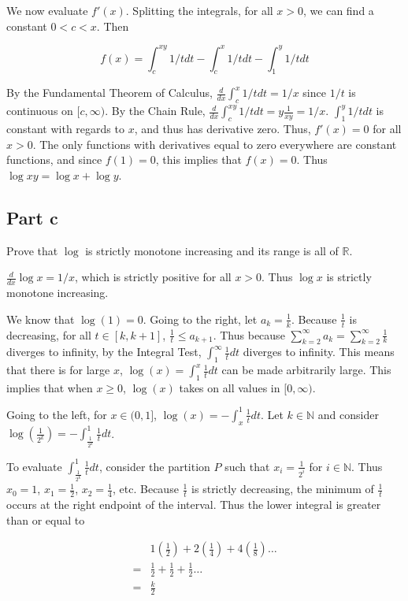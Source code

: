\documentclass{article}
\newcommand{\R}{\mathbb{R}}
\newcommand{\N}{\mathbb{N}}
\begin{document}
We now evaluate $f'(x)$. Splitting the integrals, for all $x>0$, we can find a constant $0 < c < x$. Then

\[
f(x) = \int_c^{xy} 1/t dt - \int_c^x 1/t dt - \int_1^y 1/t dt
\]

By the Fundamental Theorem of Calculus, $\frac{d}{dx} \int_c^x 1/t dt = 1/x$ since $1/t$ is continuous on $[c, \infty)$. By the Chain Rule, $\frac{d}{dx} \int_c^{xy} 1/t dt = y\frac{1}{xy} = 1/x$. $\int_1^y 1/t dt$ is constant with regards to $x$, and thus has derivative zero. Thus, $f'(x) = 0$ for all $x > 0$. The only functions with derivatives equal to zero everywhere are constant functions, and since $f(1) = 0$, this implies that $f(x) = 0$. Thus $\log xy = \log x + \log y$.

\subsection*{Part c}

Prove that $\log$ is strictly monotone increasing and its range is all of $\R$.

$\frac{d}{dx} \log x = 1/x$, which is strictly positive for all $x > 0$. Thus $\log x$ is strictly monotone increasing.

We know that $\log (1) = 0$. Going to the right, let $a_k = \frac{1}{k}$. Because $\frac{1}{t}$ is decreasing, for all $t \in [k, k+1]$, $\frac{1}{t} \leq a_{k+1}$. Thus because $\sum_{k=2}^\infty a_k = \sum_{k=2}^\infty \frac{1}{k}$ diverges to infinity, by the Integral Test, $\int_1^\infty \frac{1}{t} dt$ diverges to infinity. This means that there is for large $x$, $\log (x) = \int_1^x \frac{1}{t} dt$ can be made arbitrarily large. This implies that when $x \geq 0$, $\log(x)$ takes on all values in $[0, \infty)$.

Going to the left, for $x \in (0, 1]$, $\log(x) = - \int_x^1 \frac{1}{t} dt$. Let $k \in \N$ and consider $\log(\frac{1}{2^k}) = - \int_\frac{1}{2^k}^1 \frac{1}{t} dt$.

To evaluate $\int_\frac{1}{2^k}^1 \frac{1}{t} dt$, consider the partition $P$ such that $x_i = \frac{1}{2^i}$ for $i \in \N$. Thus $x_0 = 1$, $x_1 = \frac{1}{2}$, $x_2 = \frac{1}{4}$, etc. Because $\frac{1}{t}$ is strictly decreasing, the minimum of $\frac{1}{t}$ occurs at the right endpoint of the interval. Thus the lower integral is greater than or equal to

\begin{align*}
&1(\frac{1}{2}) + 2(\frac{1}{4}) + 4(\frac{1}{8}) \dots \\
=&\frac{1}{2} + \frac{1}{2} + \frac{1}{2} \dots \\
=&\frac{k}{2}
\end{align*}
\end{document}
